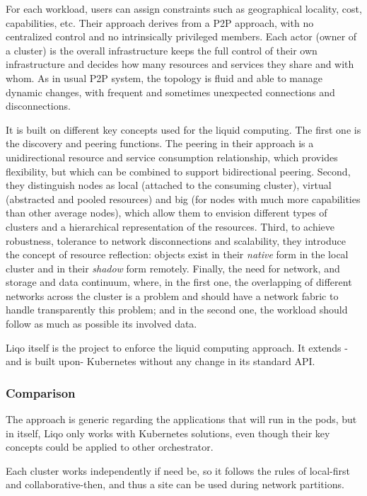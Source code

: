 For each workload, users can assign constraints such as geographical
locality, cost, capabilities, etc.
%
Their approach derives from a \acrshort{P2P} approach, with no centralized
control and no intrinsically privileged members.
%
Each actor (owner of a cluster) is the overall infrastructure keeps
the full control of their own infrastructure and decides how many
resources and services they share and with whom.
%
As in usual \acrshort{P2P} system, the topology is fluid and able to manage
dynamic changes, with frequent and sometimes unexpected connections
and disconnections.

It is built on different key concepts used for the liquid computing.
%
The first one is the discovery and peering functions. The peering in
their approach is a unidirectional resource and service consumption
relationship, which provides flexibility, but which can be combined to
support bidirectional peering.
%
Second, they distinguish nodes as local (attached to the consuming
cluster), virtual (abstracted and pooled resources) and big (for nodes
with much more capabilities than other average nodes), which allow
them to envision different types of clusters and a hierarchical
representation of the resources.
%
Third, to achieve robustness, tolerance to network disconnections and
scalability, they introduce the concept of resource reflection:
objects exist in their \emph{native} form in the local cluster and in
their \emph{shadow} form remotely.
%
Finally, the need for network, and storage and data continuum, where,
in the first one, the overlapping of different networks across the
cluster is a problem and should have a network fabric to handle
transparently this problem; and in the second one, the workload should
follow as much as possible its involved data.

Liqo itself is the project to enforce the liquid computing approach.
%
It extends -and is built upon- Kubernetes without any change in its
standard \acrshort{API}.

\subsubsection*{Comparison}

%
The approach is generic regarding the applications that will run in
the pods, but in itself, Liqo only works with Kubernetes solutions,
even though their key concepts could be applied to other orchestrator.
%

%
Each cluster works independently if need be, so it follows the rules
of local-first and collaborative-then, and thus a site can be used
during network partitions.

